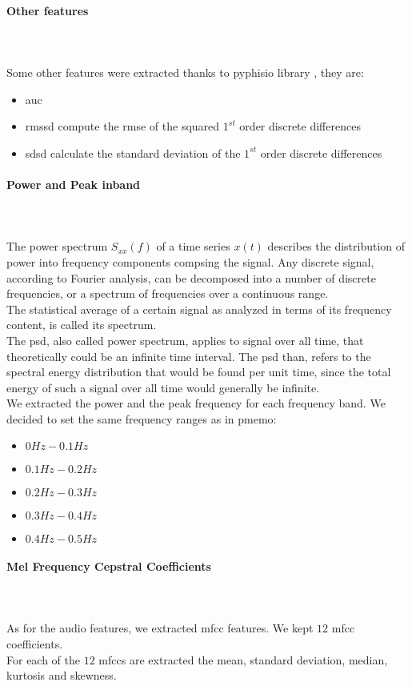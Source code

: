\paragraph{Other features}
\mbox{} \\ \\
Some other features were extracted thanks to pyphisio library \cite{bizzego2019pyphysio}, they are:
\begin{itemize}
	\item \gls{auc}
	\item \gls{rmssd} compute the \gls{rmse} of the squared $1^{st}$ order discrete differences
	\item \gls{sdsd} calculate the standard deviation of the $1^{st}$ order discrete differences
\end{itemize}

\paragraph{Power and Peak inband}
\mbox{} \\ \\
The power spectrum $S_{xx}(f)$ of a time series $x(t)$ describes the distribution of power into frequency components compsing the signal. Any discrete signal, according to Fourier analysis, can be decomposed into a number of discrete frequencies, or a spectrum of frequencies over a continuous range.
\\
The statistical average of a certain signal as analyzed in terms of its frequency content, is called its spectrum.
\\ \indent
The \gls{psd}, also called power spectrum, applies to signal over all time, that theoretically could be an infinite time interval. The \gls{psd} than, refers to the spectral energy distribution that would be found per unit time, since the total energy of such a signal over all time would generally be infinite.
\\
We extracted the power and the peak frequency for each frequency band. We decided to set the same frequency ranges as in \gls{pmemo}:
\begin{itemize}
	\item $0Hz-0.1Hz$
	\item $0.1Hz-0.2Hz$
	\item $0.2Hz-0.3Hz$
	\item $0.3Hz-0.4Hz$
	\item $0.4Hz-0.5Hz$
\end{itemize}

\paragraph{Mel Frequency Cepstral Coefficients}
\mbox{} \\ \\
As for the audio features, we extracted \gls{mfcc} features. We kept $12$ \gls{mfcc} coefficients.
\\
For each of the $12$ \gls{mfcc}s are extracted the mean, standard deviation, median, kurtosis and skewness.

